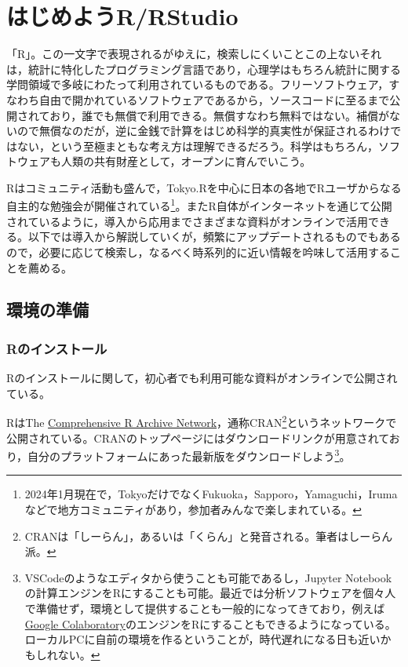 \documentclass[
  a4paper,
]{ltjsbook}
\begin{document}

\hypertarget{ux306fux3058ux3081ux3088ux3046rrstudio}{%
\chapter{はじめようR/RStudio}\label{ux306fux3058ux3081ux3088ux3046rrstudio}}

「R」。この一文字で表現されるがゆえに，検索しにくいことこの上ないそれは，統計に特化したプログラミング言語であり，心理学はもちろん統計に関する学問領域で多岐にわたって利用されているものである。フリーソフトウェア，すなわち自由で開かれているソフトウェアであるから，ソースコードに至るまで公開されており，誰でも無償で利用できる。無償すなわち無料ではない。補償がないので無償なのだが，逆に金銭で計算をはじめ科学的真実性が保証されるわけではない，という至極まともな考え方は理解できるだろう。科学はもちろん，ソフトウェアも人類の共有財産として，オープンに育んでいこう。

Rはコミュニティ活動も盛んで，Tokyo.Rを中心に日本の各地でRユーザからなる自主的な勉強会が開催されている\footnote{2024年1月現在で，TokyoだけでなくFukuoka，Sapporo，Yamaguchi，Irumaなどで地方コミュニティがあり，参加者みんなで楽しまれている。}。またR自体がインターネットを通じて公開されているように，導入から応用までさまざまな資料がオンラインで活用できる。以下では導入から解説していくが，頻繁にアップデートされるものでもあるので，必要に応じて検索し，なるべく時系列的に近い情報を吟味して活用することを薦める。

\hypertarget{ux74b0ux5883ux306eux6e96ux5099}{%
\section{環境の準備}\label{ux74b0ux5883ux306eux6e96ux5099}}

\hypertarget{rux306eux30a4ux30f3ux30b9ux30c8ux30fcux30eb}{%
\subsection{Rのインストール}\label{rux306eux30a4ux30f3ux30b9ux30c8ux30fcux30eb}}

Rのインストールに関して，初心者でも利用可能な資料がオンラインで公開されている。

RはThe \href{https://cran.r-project.org/}{Comprehensive R Archive
Network}，通称CRAN\footnote{CRANは「しーらん」，あるいは「くらん」と発音される。筆者はしーらん派。}というネットワークで公開されている。CRANのトップページにはダウンロードリンクが用意されており，自分のプラットフォームにあった最新版をダウンロードしよう\footnote{VSCodeのようなエディタから使うことも可能であるし，Jupyter
  Notebookの計算エンジンをRにすることも可能。最近では分析ソフトウェアを個々人で準備せず，環境として提供することも一般的になってきており，例えば\href{https://colab.research.google.com/}{Google
  Colaboratory}のエンジンをRにすることもできるようになっている。ローカルPCに自前の環境を作るということが，時代遅れになる日も近いかもしれない。}。
\end{document}
